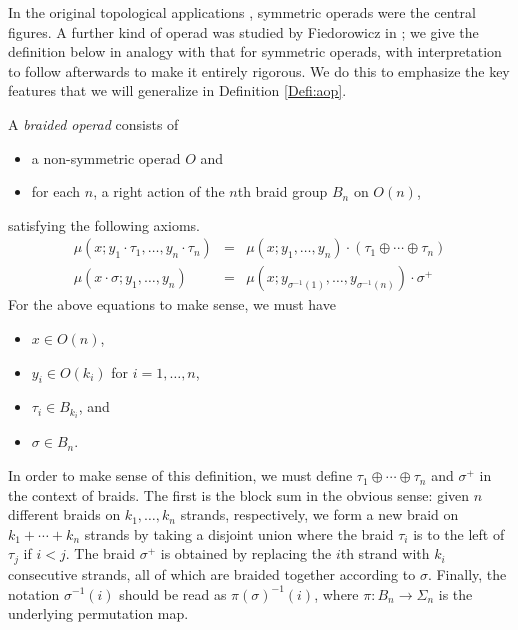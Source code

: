 \documentclass{amsbook} %
\numberwithin{section}{chapter}
\begin{document}
In the original topological applications \cite{maygeom}, symmetric operads were the central figures.  A further kind of operad was studied by Fiedorowicz in \cite{fie-br}; we give the definition below in analogy with that for symmetric operads, with interpretation to follow afterwards to make it entirely rigorous.  We do this to emphasize the key features that we will generalize in Definition \ref{Defi:aop}.

\begin{Defi}\label{broperad}
A \textit{braided operad} consists of
\begin{itemize}
\item a non-symmetric operad $O$ and
\item for each $n$, a right action of the $n$th braid group $B_{n}$ on $O(n)$,
\end{itemize}
satisfying the following axioms.
\[
\begin{array}{rcl}
\mu(x; y_{1} \cdot \tau_{1}, \ldots, y_{n} \cdot \tau_{n}) & = & \mu(x; y_{1}, \ldots, y_{n}) \cdot (\tau_{1} \oplus \cdots \oplus \tau_{n}) \\
\mu(x \cdot \sigma; y_{1}, \ldots, y_{n}) & =  & \mu(x; y_{\sigma^{-1}(1)}, \ldots, y_{\sigma^{-1}(n)}) \cdot \sigma^{+}
\end{array}
\]
For the above equations to make sense, we must have
\begin{itemize}
\item $x \in O(n)$,
\item $y_{i} \in O(k_{i})$ for $i=1, \ldots, n$,
\item $\tau_{i} \in B_{k_{i}}$, and
\item $\sigma \in B_{n}$.
\end{itemize}
\end{Defi}

In order to make sense of this definition, we must define $\tau_{1} \oplus \cdots \oplus \tau_{n}$ and $\sigma^{+}$ in the context of braids.  The first is the block sum in the obvious sense:  given $n$ different braids on $k_{1}, \ldots, k_{n}$ strands, respectively, we form a new braid on $k_{1} + \cdots + k_{n}$ strands by taking a disjoint union where the braid $\tau_{i}$ is to the left of $\tau_{j}$ if $i < j$.  The braid $\sigma^{+}$ is obtained by replacing the $i$th strand with $k_{i}$ consecutive strands, all of which are braided together according to $\sigma$.  Finally, the notation $\sigma^{-1}(i)$ should be read as $\pi(\sigma)^{-1}(i)$, where $\pi \colon B_{n} \rightarrow \Sigma_{n}$ is the underlying permutation map.
\end{document}
